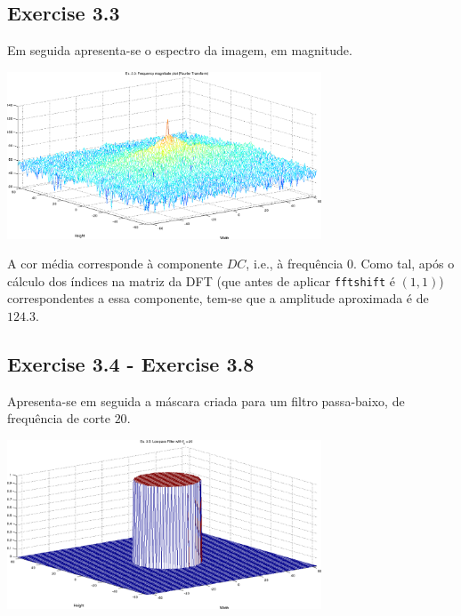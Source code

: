 \documentclass[a4paper]{article}
\begin{document}
\subsection{Exercise 3.3}
\noindent Em seguida apresenta-se o espectro da imagem, em magnitude.
\begin{center}
	\includegraphics[width=0.70\textwidth]{images/ex_3_3.png}
	\label{fig:ex_3_3}
\end{center}

\noindent A cor média corresponde à componente $DC$, i.e., à frequência $0$. Como tal, após o cálculo dos índices na matriz da DFT (que antes de aplicar \texttt{fftshift} é $(1,1)$) correspondentes a essa componente, tem-se que a amplitude aproximada é de $124.3$.

\clearpage

\subsection{Exercise 3.4 - Exercise 3.8}
\noindent Apresenta-se em seguida a máscara criada para um filtro passa-baixo, de frequência de corte $20$.
\begin{center}
	\includegraphics[width=0.70\textwidth]{images/ex_3_5_lowpass.png}
	\label{fig:ex_3_5_lowpass}
\end{center}
\end{document}

